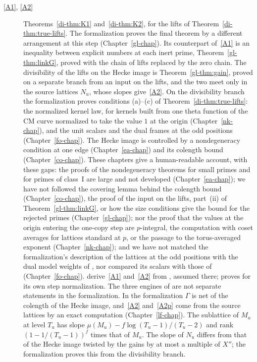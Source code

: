 \documentclass[reqno]{amsart}
\newcounter{chap}
\theoremstyle{definition}
\theoremstyle{plain}
\begin{document}
{\small
\begin{description}
\item[\eqref{A1}, \eqref{A2}] Theorems~\ref{di-thm:K1} and~\ref{di-thm:K2}, for the lifts of Theorem~\ref{di-thm:true-lifts}.  The formalization proves the final theorem by a different arrangement at this step (Chapter~\ref{gl-chap}).  Its counterpart of~\eqref{A1} is an inequality between explicit numbers at each inert prime, Theorem~\ref{gl-thm:linkG}, proved with the chain of lifts replaced by the zero chain.  The divisibility of the lifts on the Hecke image is Theorem~\ref{gl-thm:gain}, proved on a separate branch from an input on the lifts, and the two meet only in the source lattices \(N_u\), whose slopes give~\eqref{A2}.  On the divisibility branch the formalization proves conditions (a)--(c) of Theorem~\ref{di-thm:true-lifts}: the normalized kernel law, for kernels built from one theta function of the CM curve normalized to take the value \(1\) at the origin (Chapter~\ref{nk-chap}), and the unit scalars and the dual frames at the odd positions (Chapter~\ref{fo-chap}).  The Hecke image is controlled by a nondegeneracy condition at one edge (Chapter~\ref{ea-chap}) and its colength bound (Chapter~\ref{co-chap}).  These chapters give a human-readable account, with these gaps: the proofs of the nondegeneracy theorems for small primes and for primes of class~I are large and not developed (Chapter~\ref{ea-chap}); we have not followed the covering lemma behind the colength bound (Chapter~\ref{co-chap}), the proof of the input on the lifts, part~(ii) of Theorem~\ref{gl-thm:linkG}, or how the size conditions give the bound for the rejected primes (Chapter~\ref{gl-chap}); nor the proof that the values at the origin entering the one-copy step are \(p\)-integral, the computation with coset averages for lattices standard at \(p\), or the passage to the torus-averaged exponent (Chapter~\ref{nk-chap}); and we have not matched the formalization's description of the lattices at the odd positions with the dual model weights of \cite[\S11.1]{Adr}, nor compared its scalars with those of \cite[Def.~11.23]{Adr} (Chapter~\ref{fo-chap}).  \cite[Thms.~12.27 and~12.21]{Adr} derive~\eqref{A1} and~\eqref{A2} from \cite[Hyps.~11.22, 11.38, 11.42 and~12.12]{Adr}, assumed there; \cite[Prop.~11.27]{Adr} proves \cite[Hyp.~11.22]{Adr} for its own step normalization.  The three engines of \cite[Hyp.~12.12]{Adr} are not separate statements in the formalization.  In the formalization \(\Gamma\) is net of the colength of the Hecke image, and~\eqref{A2} and~\eqref{A2p} come from the source lattices by an exact computation (Chapter~\ref{lf-chap}).  The sublattice of \(M_u\) at level \(T_u\) has slope \(\mu(M_u) - f\log(T_u - 1)/(T_u - 2)\) and rank \((1 - 1/(T_u - 1))^f\) times that of \(M_u\).  The slope of \(N_u\) differs from that of the Hecke image twisted by the gains by at most a multiple of \(X''\); the formalization proves this from the divisibility branch.

\end{description}}
\end{document}

